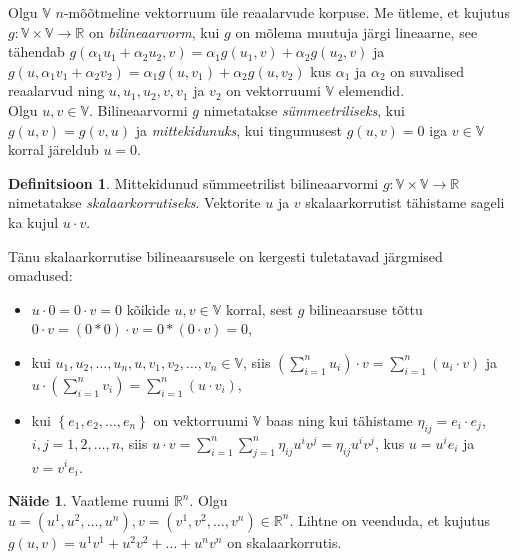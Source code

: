 \documentclass[a4paper,12pt]{article}
\theoremstyle{plain}
\theoremstyle{definition}
\newtheorem{definitsioon}{Definitsioon}[section]
\newtheorem{naide}{Näide}[section]
\numberwithin{equation}{section}
\begin{document}
Olgu $\mathbb{V}$ $n$-mõõtmeline vektorruum üle reaalarvude korpuse. Me ütleme, et kujutus $g : \mathbb{V} \times \mathbb{V} \rightarrow \mathbb{R}$ on \emph{bilineaarvorm}, kui $g$ on mõlema muutuja järgi lineaarne, see tähendab $g \left( \alpha_1 u_1 + \alpha_2 u_2, v \right) = \alpha_1 g \left( u_1, v \right) + \alpha_2 g \left( u_2, v \right)$ ja $g \left( u, \alpha_1 v_1 + \alpha_2 v_2 \right) = \alpha_1 g \left( u, v_1 \right) + \alpha_2 g \left( u, v_2 \right)$ kus $\alpha_1$ ja $\alpha_2$ on suvalised reaalarvud ning $u, u_1, u_2, v, v_1$ ja $v_2$ on vektorruumi $\mathbb{V}$ elemendid. 
\\
Olgu $u, v \in \mathbb{V}$. Bilineaarvormi $g$ nimetatakse \emph{sümmeetriliseks}, kui $g \left( u, v \right) = g \left(v, u \right)$ ja \emph{mittekidunuks}, kui tingumusest $g \left( u, v \right) = 0$ iga $v \in \mathbb{V}$ korral järeldub  $u = 0$.

\begin{definitsioon}
Mittekidunud sümmeetrilist bilineaarvormi $g: \mathbb{V} \times \mathbb{V} \rightarrow \mathbb{R}$ nimetatakse \emph{skalaarkorrutiseks}. Vektorite $u$ ja $v$ skalaarkorrutist tähistame sageli ka kujul $u \cdot v$.
\end{definitsioon}

Tänu skalaarkorrutise bilineaarsusele on kergesti tuletatavad järgmised omadused:
\begin{itemize}
\item $u \cdot 0 = 0 \cdot v = 0$ kõikide $u, v \in \mathbb{V}$ korral, sest $g$ bilineaarsuse tõttu $0 \cdot v = \left(0*0\right) \cdot v = 0*\left(0 \cdot v \right) = 0$,
\item kui $u_1, u_2, \dots, u_n, u, v_1, v_2, \dots, v_n \in \mathbb{V}$, siis $\left( \sum_{i = 1}^{n} u_i \right) \cdot v = \sum_{i = 1}^{n}  \left( u_i \cdot v \right)$ ja $u \cdot \left( \sum_{i = 1}^{n} v_i \right) = \sum_{i = 1}^{n}  \left( u \cdot v_i \right)$,
\item kui $\left\lbrace e_1, e_2, \dots, e_n \right\rbrace$ on vektorruumi $\mathbb{V}$ baas ning kui tähistame $\eta_{ij} = e_i \cdot e_j$, $i,j = 1, 2, \dots, n$, siis $u \cdot v = \sum_{i = 1}^{n} \sum_{j = 1}^{n} \eta_{ij} u^i v^j = \eta_{ij} u^i v^j$, kus $u = u^i e_i$ ja $v = v^i e_i$.
\end{itemize}

\begin{naide}
Vaatleme ruumi $\mathbb{R}^{n}$. Olgu $u = \left(u^1, u^2, \dots, u^n \right), v = \left(v^1, v^2, \dots, v^n \right) \in \mathbb{R}^{n}$. Lihtne on veenduda, et kujutus $g \left(u, v \right) = u^1v^1 + u^2v^2 + \dots + u^n v^n$ on skalaarkorrutis.
\end{naide}
\end{document}
